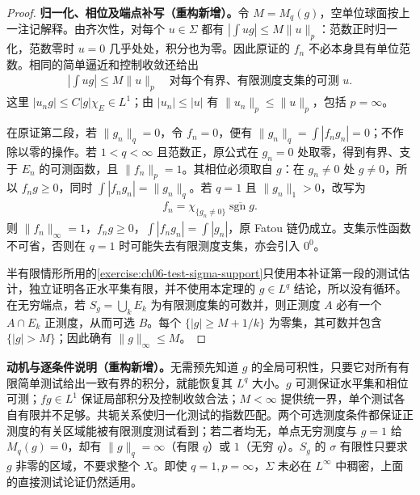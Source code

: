 \documentclass[../../main.tex]{subfiles}
\begin{document}
\begin{proof}
\textbf{归一化、相位及端点补写（重构新增）。}令 $M=M_q(g)$，空单位球面按上一注记解释。由齐次性，对每个 $u\in\Sigma$ 都有 $|\int ug|\leqslant M\|u\|_p$：范数正时归一化，范数零时 $u=0$ 几乎处处，积分也为零。因此原证的 $f_n$ 不必本身具有单位范数。相同的简单逼近和控制收敛还给出
\begin{align*}
\left|\int ug\right|\leqslant M\|u\|_p
\quad\text{对每个有界、有限测度支集的可测 }u.
\end{align*}
这里 $|u_ng|\leqslant C|g|\chi_E\in L^1$；由 $|u_n|\leqslant|u|$ 有 $\|u_n\|_p\leqslant\|u\|_p$，包括 $p=\infty$。

在原证第二段，若 $\|g_n\|_q=0$，令 $f_n=0$，便有 $\|g_n\|_q=\int|f_ng_n|=0$；不作除以零的操作。若 $1<q<\infty$ 且范数正，原公式在 $g_n=0$ 处取零，得到有界、支于 $E_n$ 的可测函数，且 $\|f_n\|_p=1$。其相位必须取自 $g$：在 $g_n\ne0$ 处 $g\ne0$，所以 $f_ng\geqslant0$，同时 $\int|f_ng_n|=\|g_n\|_q$。若 $q=1$ 且 $\|g_n\|_1>0$，改写为
\begin{align*}
f_n=\chi_{\{g_n\ne0\}}\overline{\operatorname{sgn}g}.
\end{align*}
则 $\|f_n\|_\infty=1$，$f_ng\geqslant0$，$\int|f_ng_n|=\int|g_n|$，原 Fatou 链仍成立。支集示性函数不可省，否则在 $q=1$ 时可能失去有限测度支集，亦会引入 $0^0$。

半有限情形所用的\cref{exercise:ch06-test-sigma-support}只使用本补证第一段的测试估计，独立证明各正水平集有限，并不使用本定理的 $g\in L^q$ 结论，所以没有循环。在无穷端点，若 $S_g=\bigcup_k E_k$ 为有限测度集的可数并，则正测度 $A$ 必有一个 $A\cap E_k$ 正测度，从而可选 $B$。每个 $\{|g|\geqslant M+1/k\}$ 为零集，其可数并包含 $\{|g|>M\}$；因此确有 $\|g\|_\infty\leqslant M$。
\end{proof}
\begin{remark}
\textbf{动机与逐条件说明（重构新增）。}无需预先知道 $g$ 的全局可积性，只要它对所有有限简单测试给出一致有界的积分，就能恢复其 $L^q$ 大小。$g$ 可测保证水平集和相位可测；$fg\in L^1$ 保证局部积分及控制收敛合法；$M<\infty$ 提供统一界，单个测试各自有限并不足够。共轭关系使归一化测试的指数匹配。两个可选测度条件都保证正测度的有关区域能被有限测度测试看到；若二者均无，单点无穷测度与 $g=1$ 给 $M_q(g)=0$，却有 $\|g\|_q=\infty$（有限 $q$）或 $1$（无穷 $q$）。$S_g$ 的 $\sigma$ 有限性只要求 $g$ 非零的区域，不要求整个 $X$。即使 $q=1,p=\infty$，$\Sigma$ 未必在 $L^\infty$ 中稠密，上面的直接测试论证仍然适用。
\end{remark}
\end{document}
